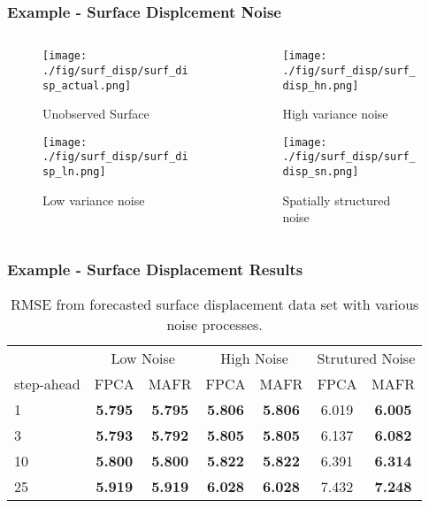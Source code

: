 \documentclass[aspectratio=169]{beamer}
\begin{document}
  \begin{frame}
    \frametitle{Example - Surface Displcement Noise}
    \begin{columns}[t]
      \begin{column}{.5\textwidth}
      \begin{figure}
        \texttt{[image: ./fig/surf\_disp/surf\_disp\_actual.png]}
      \caption{Unobserved Surface}
      \end{figure}%
      \begin{figure}
      \texttt{[image: ./fig/surf\_disp/surf\_disp\_ln.png]}
      \caption{Low variance noise}
      \end{figure}
      \end{column}
      \begin{column}{.5\textwidth}
      \begin{figure}
      \texttt{[image: ./fig/surf\_disp/surf\_disp\_hn.png]}
      \caption{High variance noise}
      \end{figure}%
      \begin{figure}
      \texttt{[image: ./fig/surf\_disp/surf\_disp\_sn.png]}
      \caption{Spatially structured noise}
      \end{figure}
      \end{column}
    \end{columns}
  \end{frame}
  
  \begin{frame}
    \frametitle{Example - Surface Displacement Results}
    \begin{table}[h]
        \setlength{\arrayrulewidth}{1.5px}
        \setlength{\tabcolsep}{10pt}
        \centering
        \begin{tabular}{lcccccc} \toprule
            & \multicolumn{2}{c}{Low Noise} & \multicolumn{2}{c}{High Noise} & \multicolumn{2}{c}{Strutured Noise} \\
            step-ahead & FPCA & MAFR & FPCA & MAFR & FPCA & MAFR \\ \bottomrule
            1 & \textbf{5.795} & \textbf{5.795} & \textbf{5.806} & \textbf{5.806} & 6.019 & \textbf{6.005} \\
            3 & \textbf{5.793} & \textbf{5.792} & \textbf{5.805} & \textbf{5.805} & 6.137 & \textbf{6.082} \\
            10 & \textbf{5.800} & \textbf{5.800} & \textbf{5.822} & \textbf{5.822} & 6.391 & \textbf{6.314} \\
            25 & \textbf{5.919} & \textbf{5.919} & \textbf{6.028} & \textbf{6.028} & 7.432 & \textbf{7.248} \\
            \bottomrule
        \end{tabular}
        \caption{RMSE from forecasted surface displacement data set with various noise processes.}
    \end{table}
  \end{frame}
\end{document}
